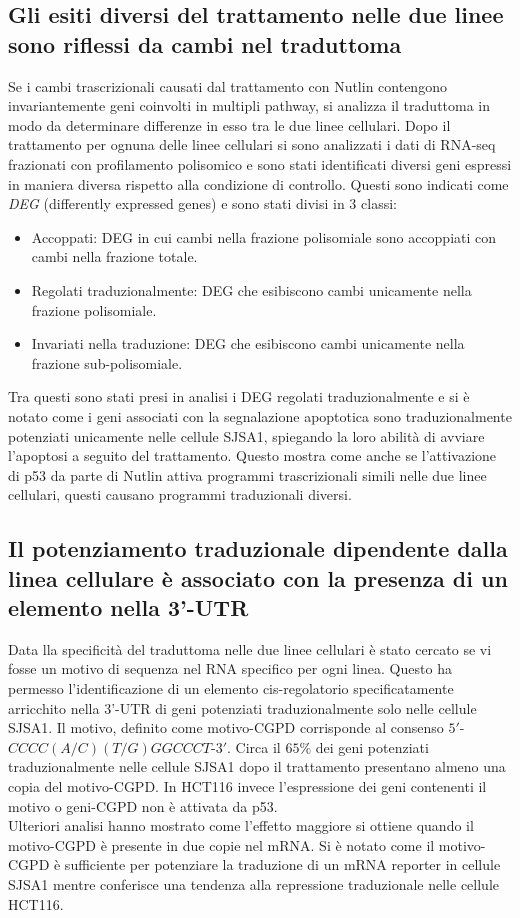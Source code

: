   \subsection{Gli esiti diversi del trattamento nelle due linee sono riflessi da cambi nel traduttoma}
  Se i cambi trascrizionali causati dal trattamento con Nutlin contengono invariantemente geni coinvolti in multipli pathway, si analizza il traduttoma in modo da determinare differenze in esso tra le due linee cellulari.
  Dopo il trattamento per ognuna delle linee cellulari si sono analizzati i dati di RNA-seq frazionati con profilamento polisomico e sono stati identificati diversi geni espressi in maniera diversa rispetto alla condizione di controllo.
  Questi sono indicati come \emph{DEG} (differently expressed genes) e sono stati divisi in $3$ classi:
  \begin{itemize}
    \item Accoppati: DEG in cui cambi nella frazione polisomiale sono accoppiati con cambi nella frazione totale.
    \item Regolati traduzionalmente: DEG che esibiscono cambi unicamente nella frazione polisomiale.
    \item Invariati nella traduzione: DEG che esibiscono cambi unicamente nella frazione sub-polisomiale.
  \end{itemize}
  Tra questi sono stati presi in analisi i DEG regolati traduzionalmente e si \`e notato come i geni associati con la segnalazione apoptotica sono traduzionalmente potenziati unicamente nelle cellule SJSA1, spiegando la loro abilit\`a di avviare l'apoptosi a seguito del trattamento.
  Questo mostra come anche se l'attivazione di p53 da parte di Nutlin attiva programmi trascrizionali simili nelle due linee cellulari, questi causano programmi traduzionali diversi.

  \subsection{Il potenziamento traduzionale dipendente dalla linea cellulare \`e associato con la presenza di un elemento nella 3'-UTR}
  \label{subsec:cgpd}
  Data lla specificit\`a del traduttoma nelle due linee cellulari \`e stato cercato se vi fosse un motivo di sequenza nel RNA specifico per ogni linea.
  Questo ha permesso l'identificazione di un elemento cis-regolatorio specificatamente arricchito nella 3'-UTR di geni potenziati traduzionalmente solo nelle cellule SJSA1.
  Il motivo, definito come motivo-CGPD corrisponde al consenso $5'$-$CCCC(A/C)(T/G)GGCCCT$-$3'$.
  Circa il $65\%$ dei geni potenziati traduzionalmente nelle cellule SJSA1 dopo il trattamento presentano almeno una copia del motivo-CGPD.
  In HCT116 invece l'espressione dei geni contenenti il motivo o geni-CGPD non \`e attivata da p53.\\
  Ulteriori analisi hanno mostrato come l'effetto maggiore si ottiene quando il motivo-CGPD \`e presente in due copie nel mRNA.
  Si \`e notato come il motivo-CGPD \`e sufficiente per potenziare la traduzione di un mRNA reporter in cellule SJSA1 mentre conferisce una tendenza alla repressione traduzionale nelle cellule HCT116.

